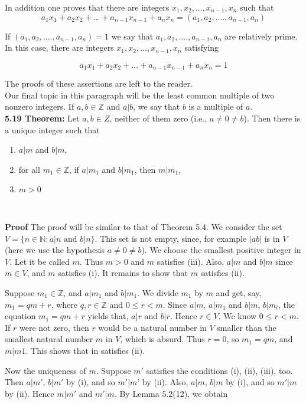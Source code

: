 \documentclass[11pt]{amsbook}
\begin{document}
In addition one proves that there are integers $x_1,x_2,...,x_{n-1},x_n$ such that
\begin{equation*}
	a_1 x_1 + a_2 x_2 + ... + a_{n-1} x_{n-1} + a_n x_n = (a_1,a_2,....,a_{n-1},a_n)
\end{equation*}

If $(a_1,a_2,....,a_{n-1},a_n)=1$  we say that $a_1,a_2,....,a_{n-1},a_n$ are relatively prime.
In this case, there are integers $x_1,x_2,...,x_{n-1},x_n$ satisfying

\begin{equation*}
	a_1 x_1 + a_2 x_2 + ... + a_{n-1} x_{n-1} + a_n x_n = 1
\end{equation*}

The proofs of these assertions are left to the reader.\\

Our final topic in this paragraph will be the least common multiple of
two nonzero integers. If $a,b \in \mathbb{Z}$ and $a|b$, we say that $b$ is a multiple of $a$.\\

\textbf{5.19 Theorem:} Let $a,b \in Z$, neither of them zero (i.e., $a \neq 0 \neq b$). Then
there is a unique integer such that\

\begin{enumerate}[label=(\alph*)]
\item $a|m$ and $b|m$,
\item for all $m_1 \in \mathbb{Z}$, if $a|m_1$ and $b|m_1$, then $m|m_1$,
\item $m > 0$
\end{enumerate}\

\textbf{Proof} The proof will be similar to that of Theorem 5.4. We consider the set $V = \{ n \in \mathbb{N} : a|n \text{ and } b|n \}$. This set is not empty, since, for example $|ab|$ is in $V$ (here we use the hypothesis $a \neq 0 \neq b$). We choose the smallest positive integer in $V$. Let it be called $m$. Thus $m > 0$ and $m$ satisfies (iii). Also, $a|m$ and $b|m$ since $m \in V$, and $m$ satisfies (i). It remains to show that $m$ satisfies (ii). 

Suppose $m_1 \in \mathbb{Z}$, and $a|m_1$ and $b|m_1$. We divide $m_1$ by $m$ and get, say, $m_1 = qm + r$, where $q,r \in \mathbb{Z}$ and $0 \leq r < m$. Since $a|m$, $a|m_1$ and $b|m$, $b|m_l$, the equation $m_1 = qm + r$ yields that, $a|r$ and $b|r$. Hence $r \in V$. We know $0 \leq r < m$. If $r$ were not zero, then $r$ would be a natural number in $V$ smaller than the smallest natural number $m$ in $V$, which is absurd. Thus $r = 0$, so $m_1 = qm$, and $m|m1$. This shows that in satisfies (ii).

Now the uniqueness of $m$. Suppose $m'$ satisfies the conditions (i), (ii), (iii), too. Then $a|m'$, $b|m'$ by (i), and so $m'|m$' by (ii). Also, $a|m$, $b|m$ by (i), and so $m'|m$ by (ii). Hence $m|m'$ and $m'|m$. By Lemma 5.2(12), we obtain 
\end{document}
